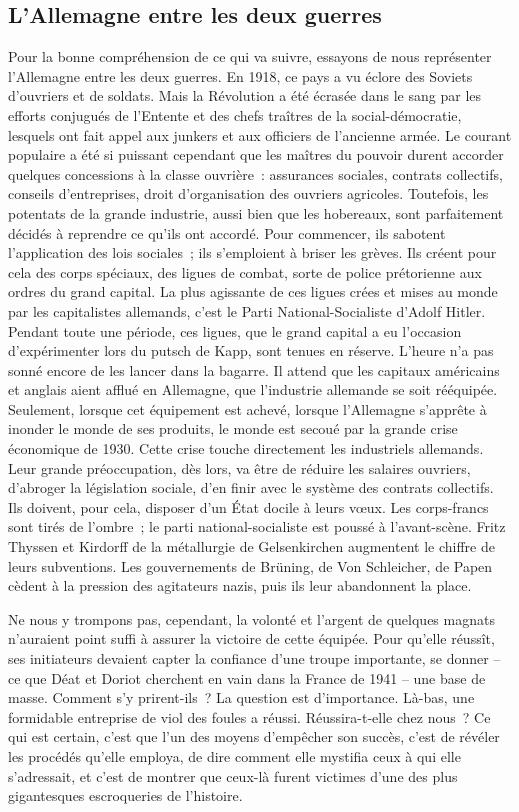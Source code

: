 \documentclass[french,twoside]{book} %
\begin{document}
\subsection[L’Allemagne entre les deux guerres]{L’Allemagne entre les deux guerres}
\noindent Pour la bonne compréhension de ce qui va suivre, essayons de nous représenter l’Allemagne entre les deux guerres. En 1918, ce pays a vu éclore des Soviets d’ouvriers et de soldats. Mais la Révolution a été écrasée dans le sang par les efforts conjugués de l’Entente et des chefs traîtres de la social-démocratie, lesquels ont fait appel aux junkers et aux officiers de l’ancienne armée. Le courant populaire a été si puissant cependant que les maîtres du pouvoir durent accorder quelques concessions à la classe ouvrière : assurances sociales, contrats collectifs, conseils d’entreprises, droit d’organisation des ouvriers agricoles. Toutefois, les potentats de la grande industrie, aussi bien que les hobereaux, sont parfaitement décidés à reprendre ce qu’ils ont accordé. Pour commencer, ils sabotent l’application des lois sociales ; ils s’emploient à briser les grèves. Ils créent pour cela des corps spéciaux, des ligues de combat, sorte de police prétorienne aux ordres du grand capital. La plus agissante de ces ligues crées et mises au monde par les capitalistes allemands, c’est le Parti National-Socialiste d’Adolf Hitler. Pendant toute une période, ces ligues, que le grand capital a eu l’occasion d’expérimenter lors du putsch de Kapp, sont tenues en réserve. L’heure n’a pas sonné encore de les lancer dans la bagarre. Il attend que les capitaux américains et anglais aient afflué en Allemagne, que l’industrie allemande se soit rééquipée. Seulement, lorsque cet équipement est achevé, lorsque l’Allemagne s’apprête à inonder le monde de ses produits, le monde est secoué par la grande crise économique de 1930. Cette crise touche directement les industriels allemands. Leur grande préoccupation, dès lors, va être de réduire les salaires ouvriers, d’abroger la législation sociale, d’en finir avec le système des contrats collectifs. Ils doivent, pour cela, disposer d’un État docile à leurs vœux. Les corps-francs sont tirés de l’ombre ; le parti national-socialiste est poussé à l’avant-scène. Fritz Thyssen et Kirdorff de la métallurgie de Gelsenkirchen augmentent le chiffre de leurs subventions. Les gouvernements de Brüning, de Von Schleicher, de Papen cèdent à la pression des agitateurs nazis, puis ils leur abandonnent la place.\par
Ne nous y trompons pas, cependant, la volonté et l’argent de quelques magnats n’auraient point suffi à assurer la victoire de cette équipée. Pour qu’elle réussît, ses initiateurs devaient capter la confiance d’une troupe importante, se donner – ce que Déat et Doriot cherchent en vain dans la France de 1941 – une base de masse. Comment s’y prirent-ils ? La question est d’importance. Là-bas, une formidable entreprise de viol des foules a réussi. Réussira-t-elle chez nous ? Ce qui est certain, c’est que l’un des moyens d’empêcher son succès, c’est de révéler les procédés qu’elle employa, de dire comment elle mystifia ceux à qui elle s’adressait, et c’est de montrer que ceux-là furent victimes d’une des plus gigantesques escroqueries de l’histoire.
\end{document}
